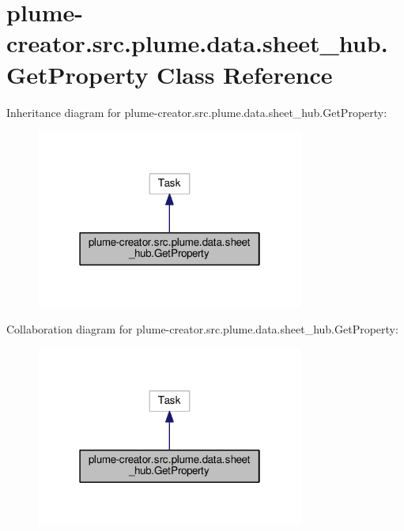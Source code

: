 \hypertarget{classplume-creator_1_1src_1_1plume_1_1data_1_1sheet__hub_1_1_get_property}{}\section{plume-\/creator.src.\+plume.\+data.\+sheet\+\_\+hub.\+Get\+Property Class Reference}
\label{classplume-creator_1_1src_1_1plume_1_1data_1_1sheet__hub_1_1_get_property}


Inheritance diagram for plume-\/creator.src.\+plume.\+data.\+sheet\+\_\+hub.\+Get\+Property\+:\nopagebreak
\begin{figure}[H]
\begin{center}
\leavevmode
\includegraphics[width=250pt]{classplume-creator_1_1src_1_1plume_1_1data_1_1sheet__hub_1_1_get_property__inherit__graph}
\end{center}
\end{figure}


Collaboration diagram for plume-\/creator.src.\+plume.\+data.\+sheet\+\_\+hub.\+Get\+Property\+:\nopagebreak
\begin{figure}[H]
\begin{center}
\leavevmode
\includegraphics[width=250pt]{classplume-creator_1_1src_1_1plume_1_1data_1_1sheet__hub_1_1_get_property__coll__graph}
\end{center}
\end{figure}
